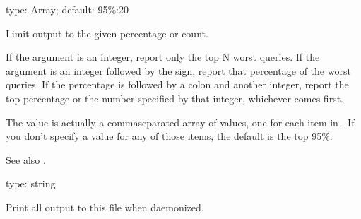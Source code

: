 \documentclass[letterpaper,10pt,english]{sphinxmanual}
\begin{document}
\begin{fulllineitems}
\label{\detokenize{mariadb-query-digest:cmdoption-mariadb-query-digest-limit}}
type: Array; default: 95\%:20

Limit output to the given percentage or count.

If the argument is an integer, report only the top N worst queries.  If the
argument is an integer followed by the \sphinxcode{\sphinxupquote{\%}} sign, report that percentage of the
worst queries.  If the percentage is followed by a colon and another integer,
report the top percentage or the number specified by that integer, whichever
comes first.

The value is actually a comma\sphinxhyphen{}separated array of values, one for each item in
{\hyperref[\detokenize{mariadb-query-digest:cmdoption-mariadb-query-digest-group-by}]{}}.  If you don’t specify a value for any of those items, the
default is the top 95\%.

See also {\hyperref[\detokenize{mariadb-query-digest:cmdoption-mariadb-query-digest-outliers}]{}}.

\end{fulllineitems}


\begin{fulllineitems}
\label{\detokenize{mariadb-query-digest:cmdoption-mariadb-query-digest-log}}
type: string

Print all output to this file when daemonized.

\end{fulllineitems}

\end{document}
